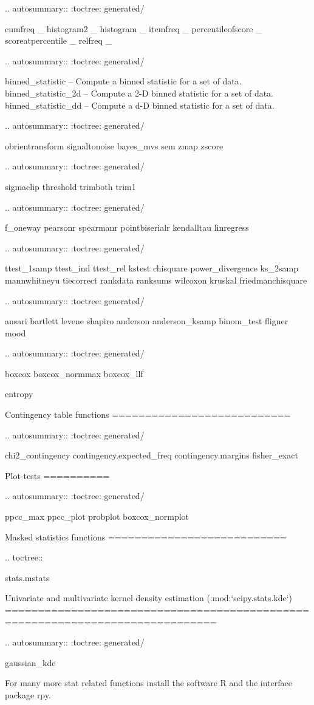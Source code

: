 \begin{DoxyVerb}
.. autosummary::
   :toctree: generated/

   cumfreq           _
   histogram2        _
   histogram         _
   itemfreq          _
   percentileofscore _
   scoreatpercentile _
   relfreq           _

.. autosummary::
   :toctree: generated/

   binned_statistic     -- Compute a binned statistic for a set of data.
   binned_statistic_2d  -- Compute a 2-D binned statistic for a set of data.
   binned_statistic_dd  -- Compute a d-D binned statistic for a set of data.

.. autosummary::
   :toctree: generated/

   obrientransform
   signaltonoise
   bayes_mvs
   sem
   zmap
   zscore

.. autosummary::
   :toctree: generated/

   sigmaclip
   threshold
   trimboth
   trim1

.. autosummary::
   :toctree: generated/

   f_oneway
   pearsonr
   spearmanr
   pointbiserialr
   kendalltau
   linregress

.. autosummary::
   :toctree: generated/

   ttest_1samp
   ttest_ind
   ttest_rel
   kstest
   chisquare
   power_divergence
   ks_2samp
   mannwhitneyu
   tiecorrect
   rankdata
   ranksums
   wilcoxon
   kruskal
   friedmanchisquare

.. autosummary::
   :toctree: generated/

   ansari
   bartlett
   levene
   shapiro
   anderson
   anderson_ksamp
   binom_test
   fligner
   mood

.. autosummary::
   :toctree: generated/

   boxcox
   boxcox_normmax
   boxcox_llf

   entropy

Contingency table functions
===========================

.. autosummary::
   :toctree: generated/

   chi2_contingency
   contingency.expected_freq
   contingency.margins
   fisher_exact

Plot-tests
==========

.. autosummary::
   :toctree: generated/

   ppcc_max
   ppcc_plot
   probplot
   boxcox_normplot


Masked statistics functions
===========================

.. toctree::

   stats.mstats


Univariate and multivariate kernel density estimation (:mod:`scipy.stats.kde`)
==============================================================================

.. autosummary::
   :toctree: generated/

   gaussian_kde

For many more stat related functions install the software R and the
interface package rpy.\end{DoxyVerb}
 

